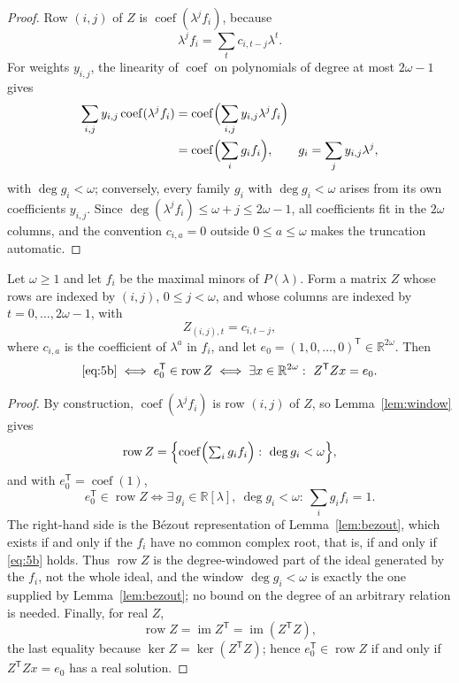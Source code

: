 \begin{proof}
	Row $(i,j)$ of $Z$ is $\operatorname{coef}(\lambda^jf_i)$, because
	\[
	\lambda^jf_i=\sum_t c_{i,t-j}\lambda^t .
	\]
	For weights $y_{i,j}$, the linearity of $\operatorname{coef}$ on
	polynomials of degree at most $2\omega-1$ gives
	\[
	\begin{aligned}
	\sum_{i,j}y_{i,j}\operatorname{coef}(\lambda^jf_i)
	&=\operatorname{coef}\Bigl(\sum_{i,j}y_{i,j}\lambda^jf_i\Bigr)\\
	&=\operatorname{coef}\Bigl(\sum_i g_if_i\Bigr),
	\qquad g_i=\sum_j y_{i,j}\lambda^j,
	\end{aligned}
	\]
	with $\deg g_i<\omega$; conversely, every family $g_i$ with
	$\deg g_i<\omega$ arises from its own coefficients $y_{i,j}$. Since
	$\deg(\lambda^jf_i)\le\omega+j\le2\omega-1$, all coefficients fit in
	the $2\omega$ columns, and the convention $c_{i,a}=0$ outside
	$0\le a\le\omega$ makes the truncation automatic.
\end{proof}

\begin{prop}\label{prop:gram}\label{sec:gram}
	Let $\omega\ge1$ and let $f_i$ be the maximal minors of $P(\lambda)$.
	Form a matrix $Z$ whose rows are indexed by $(i,j)$, $0\le j<\omega$,
	and whose columns are indexed by $t=0,\ldots,2\omega-1$, with
	\[
	Z_{(i,j),t}=c_{i,t-j},
	\]
	where $c_{i,a}$ is the coefficient of $\lambda^a$ in $f_i$, and let
	$e_0=(1,0,\ldots,0)^{\mathsf T}\in\mathbb R^{2\omega}$. Then
	\[
	\eqref{eq:5b}
	\iff e_0^{\mathsf T}\in\operatorname{row}Z
	\iff\exists x\in\mathbb R^{2\omega}:\ Z^{\mathsf T}Zx=e_0 .
	\]
\end{prop}

\begin{proof}
	By construction, $\operatorname{coef}(\lambda^jf_i)$ is row $(i,j)$ of
	$Z$, so Lemma~\ref{lem:window} gives
	\[
	\operatorname{row}Z=
	\Bigl\{
	\operatorname{coef}\Bigl(\textstyle\sum_i g_if_i\Bigr)
	:\ \deg g_i<\omega
	\Bigr\},
	\]
	and with $e_0^{\mathsf T}=\operatorname{coef}(1)$,
	\[
	e_0^{\mathsf T}\in\operatorname{row}Z
	\iff
	\exists\,g_i\in\mathbb R[\lambda],\ \deg g_i<\omega:\
	\sum_i g_if_i=1 .
	\]
	The right-hand side is the B\'ezout representation of
	Lemma~\ref{lem:bezout}, which exists if and only if the $f_i$ have no
	common complex root, that is, if and only if \eqref{eq:5b} holds. Thus
	$\operatorname{row}Z$ is the degree-windowed part of the ideal generated
	by the $f_i$, not the whole ideal, and the window $\deg g_i<\omega$ is
	exactly the one supplied by Lemma~\ref{lem:bezout}; no bound on the
	degree of an arbitrary relation is needed. Finally, for real $Z$,
	\[
	\operatorname{row}Z=\operatorname{im}Z^{\mathsf T}
	=\operatorname{im}(Z^{\mathsf T}Z),
	\]
	the last equality because $\ker Z=\ker(Z^{\mathsf T}Z)$; hence
	$e_0^{\mathsf T}\in\operatorname{row}Z$ if and only if
	$Z^{\mathsf T}Zx=e_0$ has a real solution.
\end{proof}

